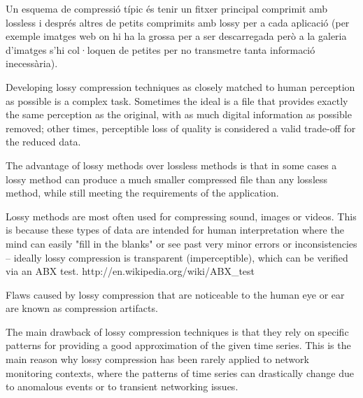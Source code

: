 Un esquema de compressió típic és tenir un fitxer principal comprimit amb lossless i després altres de petits comprimits amb lossy per a cada aplicació (per exemple imatges web on hi ha la grossa per a ser descarregada però a la galeria d'imatges s'hi col·loquen de petites per no transmetre tanta informació inecessària).



Developing lossy compression techniques as closely matched to human perception as possible is a complex task. Sometimes the ideal is a file that provides exactly the same perception as the original, with as much digital information as possible removed; other times, perceptible loss of quality is considered a valid trade-off for the reduced data.

The advantage of lossy methods over lossless methods is that in some cases a lossy method can produce a much smaller compressed file than any lossless method, while still meeting the requirements of the application.

Lossy methods are most often used for compressing sound, images or videos. This is because these types of data are intended for human interpretation where the mind can easily "fill in the blanks" or see past very minor errors or inconsistencies – ideally lossy compression is transparent (imperceptible), which can be verified via an ABX test. http://en.wikipedia.org/wiki/ABX_test

Flaws caused by lossy compression that are noticeable to the human eye or ear are known as compression artifacts.






The main drawback of lossy compression techniques is that they
rely on specific patterns for providing a good approximation of the given time series.
This is the main reason why lossy compression has been rarely applied to network
monitoring contexts, where the patterns of time series can drastically change due to
anomalous events or to transient networking issues.



